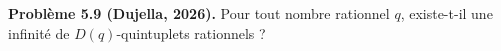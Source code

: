 \textbf{Problème 5.9 (Dujella, 2026).} Pour tout nombre rationnel $q$, existe-t-il une infinité de $D(q)$-quintuplets rationnels ?
